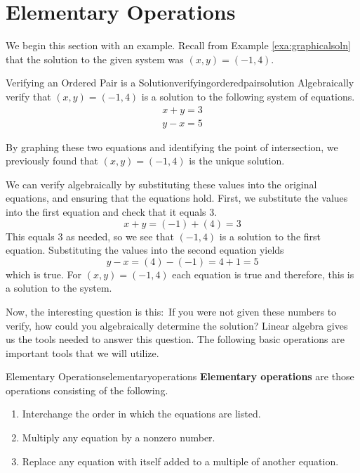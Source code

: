 \section{Elementary Operations}

We begin this section with an example. Recall from Example \ref{exa:graphicalsoln} that the solution to the given system was $\left(x, y \right) = \left( -1, 4 \right)$. 

\begin{example}{Verifying an Ordered Pair is a Solution}{verifyingorderedpairsolution}
Algebraically verify that $\left(x, y \right) = \left( -1, 4 \right)$ is a solution to the following system of equations.
\[
\begin{array}{c}
x+y=3 \\
y-x=5  
\end{array}
\]
\end{example}

\begin{solution} 
By graphing these two equations and identifying the point of
intersection, we previously found that $\left(x, y \right) = \left(
-1, 4 \right)$ is the unique solution.

We can verify algebraically by substituting these values
into the original equations, and ensuring that the equations hold. 
First, we substitute the values into the first equation and check that it equals $3$. 
\[
x + y = (-1)+(4) = 3
\]
This equals $3$ as needed, so we see that $\left( -1,4 \right)$ is a solution to the first equation. 
Substituting the values into the second equation yields
\[
y -x = (4) - (-1) = 4 + 1  = 5
\]
which is true.
For
$\left( x,y\right) =\left( -1,4\right) $ each equation is true and therefore, this is a solution to the system.
\end{solution}

Now, the interesting question is this:\ If you were not given
these numbers to verify, how could you algebraically determine the solution? Linear algebra gives us the tools needed to answer this
question. The following basic operations are important tools that we will  utilize.

\begin{definition}{Elementary Operations}{elementaryoperations}
\textbf{Elementary operations}  are those
operations consisting of the following.

\begin{enumerate}
\item Interchange the order in which the equations are listed.

\item Multiply any equation by a nonzero number.

\item Replace any equation with itself added to a multiple of another
equation.

\end{enumerate}
\end{definition}

